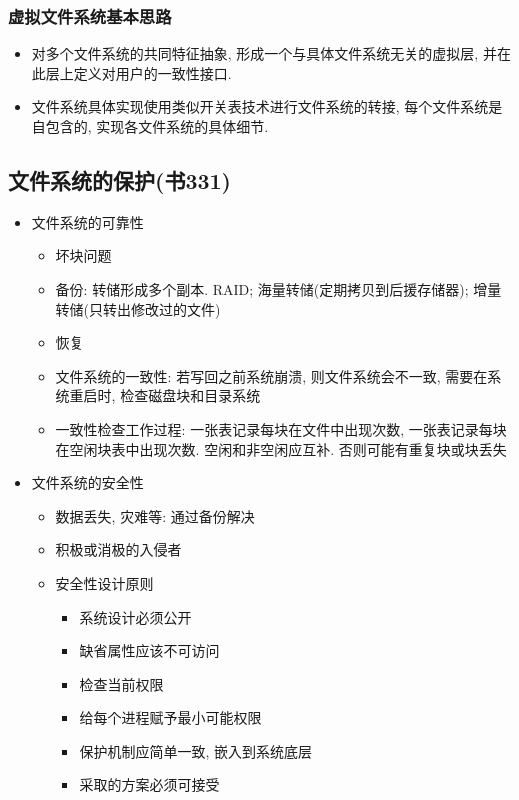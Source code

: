 \documentclass[a4paper, UTF8]{article}
\begin{document}
\subsubsection{虚拟文件系统基本思路}
\begin{itemize}
\item 对多个文件系统的共同特征抽象, 形成一个与具体文件系统无关的虚拟层, 并在此层上定义对用户的一致性接口.
\item 文件系统具体实现使用类似开关表技术进行文件系统的转接, 每个文件系统是自包含的, 实现各文件系统的具体细节.
\end{itemize}

\subsection{文件系统的保护(书331)}
\begin{itemize}
\item 文件系统的可靠性
	\begin{itemize}
	\item 坏块问题
	\item 备份: 转储形成多个副本. RAID; 海量转储(定期拷贝到后援存储器); 增量转储(只转出修改过的文件)
	\item 恢复
	\item 文件系统的一致性: 若写回之前系统崩溃, 则文件系统会不一致, 需要在系统重启时, 检查磁盘块和目录系统
	\item 一致性检查工作过程: 一张表记录每块在文件中出现次数, 一张表记录每块在空闲块表中出现次数. 空闲和非空闲应互补. 否则可能有重复块或块丢失
	\end{itemize}
\item 文件系统的安全性
	\begin{itemize}
	\item 数据丢失, 灾难等: 通过备份解决
	\item 积极或消极的入侵者
	\item 安全性设计原则
		\begin{itemize}
		\item 系统设计必须公开
		\item 缺省属性应该不可访问
		\item 检查当前权限
		\item 给每个进程赋予最小可能权限
		\item 保护机制应简单一致, 嵌入到系统底层
		\item 采取的方案必须可接受
		\end{itemize}
	\end{itemize}
\end{itemize}
\end{document}
